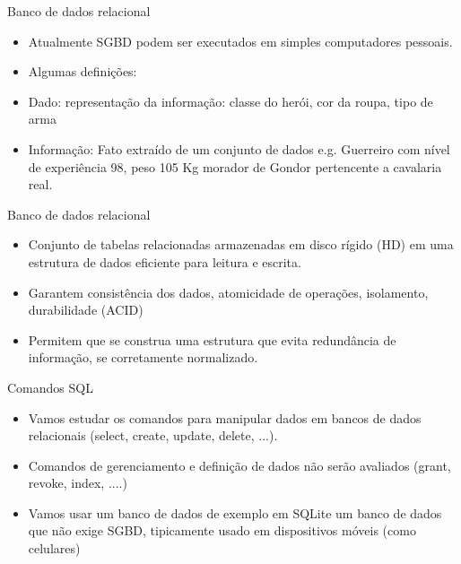 \begin{frame}
	\begin{block}{Banco de dados relacional}
		\begin{itemize}
			\item Atualmente SGBD podem ser executados em simples computadores pessoais. 
			
			\item Algumas definições:
			
			\item Dado: representação da informação: classe do herói, cor da roupa, 
			      tipo de arma
			
			\item Informação: Fato extraído de um conjunto de dados e.g. Guerreiro com nível de experiência 98, peso 105 Kg morador de Gondor pertencente a cavalaria real.
		\end{itemize}
	\end{block}
\end{frame}

\begin{frame}
	\begin{block}{Banco de dados relacional}
		\begin{itemize}
			\item Conjunto de tabelas relacionadas armazenadas em disco rígido (HD) em uma estrutura de dados eficiente para leitura e escrita.
			
			\item Garantem consistência dos dados, atomicidade de operações, isolamento, durabilidade (ACID)
				
			\item Permitem que se construa uma estrutura que evita redundância de informação, se corretamente normalizado.
		\end{itemize}
	\end{block}
\end{frame}


\begin{frame}
	\begin{block}{Comandos SQL}
		\begin{itemize}
			\item Vamos estudar os comandos para manipular dados em bancos de dados relacionais (select, create, update, delete, ...). 

			\item Comandos de gerenciamento e definição de dados não serão avaliados (grant, revoke, index, ....)
			
			\item Vamos usar um banco de dados de exemplo em SQLite um banco de dados que não exige SGBD, tipicamente usado em dispositivos móveis (como celulares)
		\end{itemize}
	\end{block}
\end{frame}


